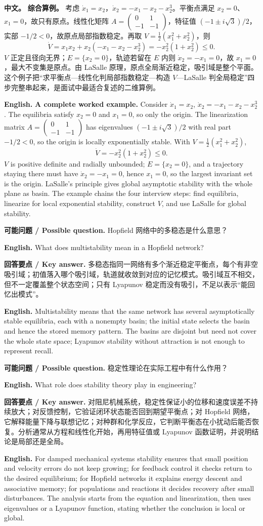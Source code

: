 \documentclass[UTF8,11pt,a4paper]{ctexart}
\newcommand{\EN}[1]{\par\noindent\textbf{English.} #1\par}
\newcommand{\ASK}[4]{\begin{samepage}\par\noindent\textbf{可能问题 / Possible question.} #1\par\EN{#2}\noindent\textbf{回答要点 / Key answer.} #3\par\EN{#4}\smallskip\end{samepage}}
\newcommand{\APS}[2]{\par\noindent\textbf{中文。} #1\par\noindent\textbf{English.} #2\par}
\begin{document}
\APS{\textbf{综合算例。} 考虑 $\dot x_1=x_2$，$\dot x_2=-x_1-x_2-x_2^3$。平衡点满足 $x_2=0$、$x_1=0$，故只有原点。线性化矩阵 $A=\begin{pmatrix}0&1\\-1&-1\end{pmatrix}$，特征值 $(-1\pm i\sqrt3)/2$，实部 $-1/2<0$，故原点局部指数稳定。再取 $V=\frac12(x_1^2+x_2^2)$，则
\[
\dot V=x_1x_2+x_2(-x_1-x_2-x_2^3)=-x_2^2(1+x_2^2)\le0 .
\]
$V$ 正定且径向无界；$E=\{x_2=0\}$，轨迹若留在 $E$ 内则 $\dot x_2=-x_1=0$，故 $x_1=0$，最大不变集是原点。由 LaSalle 原理，原点全局渐近稳定，吸引域是整个平面。这个例子把“求平衡点—线性化判局部指数稳定—构造 $V$—LaSalle 判全局稳定”四步完整串起来，是面试中最适合复述的二维算例。}{\textbf{A complete worked example.} Consider $\dot x_1=x_2$, $\dot x_2=-x_1-x_2-x_2^3$. The equilibria satisfy $x_2=0$ and $x_1=0$, so only the origin. The linearization matrix $A=\begin{pmatrix}0&1\\-1&-1\end{pmatrix}$ has eigenvalues $(-1\pm i\sqrt3)/2$ with real part $-1/2<0$, so the origin is locally exponentially stable. With $V=\frac12(x_1^2+x_2^2)$,
\[
\dot V=-x_2^2(1+x_2^2)\le0 .
\]
$V$ is positive definite and radially unbounded; $E=\{x_2=0\}$, and a trajectory staying there must have $\dot x_2=-x_1=0$, hence $x_1=0$, so the largest invariant set is the origin. LaSalle's principle gives global asymptotic stability with the whole plane as basin. The example chains the four interview steps: find equilibria, linearize for local exponential stability, construct $V$, and use LaSalle for global stability.}

\ASK{Hopfield 网络中的多稳态是什么意思？}{What does multistability mean in a Hopfield network?}{多稳态指同一网络有多个渐近稳定平衡点，每个有非空吸引域；初值落入哪个吸引域，轨道就收敛到对应的记忆模式。吸引域互不相交，但不一定覆盖整个状态空间；只有 Lyapunov 稳定而没有吸引，不足以表示“能回忆出模式”。}{Multistability means that the same network has several asymptotically stable equilibria, each with a nonempty basin; the initial state selects the basin and hence the stored memory pattern. The basins are disjoint but need not cover the whole state space; Lyapunov stability without attraction is not enough to represent recall.}

\ASK{稳定性理论在实际工程中有什么作用？}{What role does stability theory play in engineering?}{对阻尼机械系统，稳定性保证小的位移和速度误差不持续放大；对反馈控制，它验证闭环状态能否回到期望平衡点；对 Hopfield 网络，它解释能量下降与联想记忆；对种群和化学反应，它判断平衡态在小扰动后能否恢复。分析通常从方程和线性化开始，再用特征值或 Lyapunov 函数证明，并说明结论是局部还是全局。}{For damped mechanical systems stability ensures that small position and velocity errors do not keep growing; for feedback control it checks return to the desired equilibrium; for Hopfield networks it explains energy descent and associative memory; for populations and reactions it decides recovery after small disturbances. The analysis starts from the equation and linearization, then uses eigenvalues or a Lyapunov function, stating whether the conclusion is local or global.}
\end{document}
